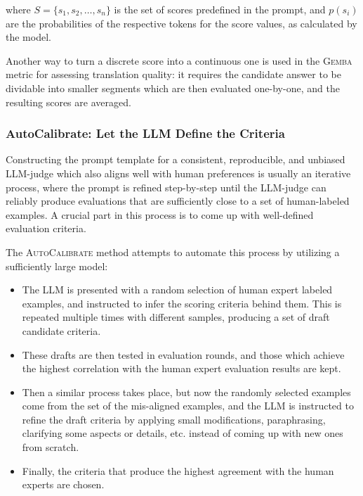 \documentclass[noindent,nohyp,parspace,titlepage,twoside,12pt]{article}
\begin{document}
        where $S = \{s_1, s_2, \ldots, s_n\}$ is the set of scores predefined
        in the prompt, and $p(s_i)$ are the probabilities of the respective
        tokens for the score values, as calculated by the model.

        Another way to turn a discrete score into a continuous one is used
        in the \textsc{Gemba} metric \cite{gemba} for assessing translation
        quality: it requires the candidate answer to be dividable into smaller
        segments which are then evaluated one-by-one, and the resulting scores
        are averaged.

      \subsubsection{AutoCalibrate: Let the LLM Define the Criteria}

        Constructing the prompt template for a consistent, reproducible, and
        unbiased LLM-judge which also aligns well with human preferences is
        usually an iterative process, where the prompt is refined step-by-step
        until the LLM-judge can reliably produce evaluations that are
        sufficiently close to a set of human-labeled examples. A crucial part
        in this process is to come up with well-defined evaluation criteria.

        The \textsc{AutoCalibrate} method \cite{autocal} attempts to automate
        this process by utilizing a sufficiently large model:

        \begin{itemize}
          \item The LLM is presented with a random selection of human expert
                labeled examples, and instructed to infer the scoring
                criteria behind them. This is repeated multiple times with
                different samples, producing a set of draft candidate criteria.

          \item These drafts are then tested in evaluation rounds, and those
                which achieve the highest correlation with the human expert
                evaluation results are kept.

          \item Then a similar process takes place, but now the randomly
                selected examples come from the set of the mis-aligned
                examples, and the LLM is instructed to refine the draft
                criteria by applying small modifications, paraphrasing,
                clarifying some aspects or details, etc. instead of coming up
                with new ones from scratch.

          \item Finally, the criteria that produce the highest agreement with
                the human experts are chosen.
      \end{itemize}

\newpage

  \nocite{*}
  \printbibliography[heading=bibintoc]
\end{document}
